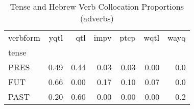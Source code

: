 \begin{table}[htbp!]
\centering
\caption{Tense and Hebrew Verb Collocation Proportions (adverbs)}
\label{table:advb_tense_pr}
\begin{tabular}{lrrrrrr}
\toprule
verbform &  yqtl &   qtl &  impv &  ptcp &  wqtl &  wayq \\
tense &       &       &       &       &       &       \\
\midrule
PRES  &  0.49 &  0.44 &  0.03 &  0.03 &  0.00 &   0.0 \\
FUT   &  0.66 &  0.00 &  0.17 &  0.10 &  0.07 &   0.0 \\
PAST  &  0.20 &  0.60 &  0.00 &  0.00 &  0.00 &   0.2 \\
\bottomrule
\end{tabular}
\end{table}
